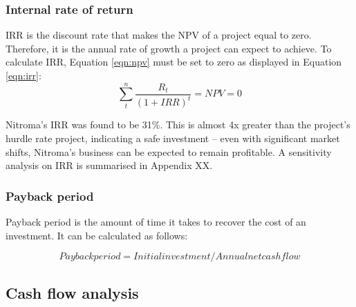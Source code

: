 \subsubsection{Internal rate of return}
IRR is the discount rate that makes the NPV of a project equal to zero. Therefore, it is the annual rate of growth a project can expect to achieve. To calculate IRR, Equation \ref{eqn:npv} must be set to zero as displayed in Equation \ref{eqn:irr}:
\begin{equation}
\label{eqn:irr}
    \sum_t^n\frac{R_{t}}{(1+IRR)^{t}}=NPV=0
\end{equation}

Nitroma’s IRR was found to be 31\%. This is almost 4x greater than the project’s hurdle rate project, indicating a safe investment – even with significant market shifts, Nitroma’s business can be expected to remain profitable. A sensitivity analysis on IRR is summarised in Appendix XX.

\subsubsection{Payback period}
Payback period is the amount of time it takes to recover the cost of an investment. It can be calculated as follows:

\begin{equation}
\label{eqn:payback}
    Payback period = Initial investment/Annual net cash flow
\end{equation}


\subsection{Cash flow analysis}
